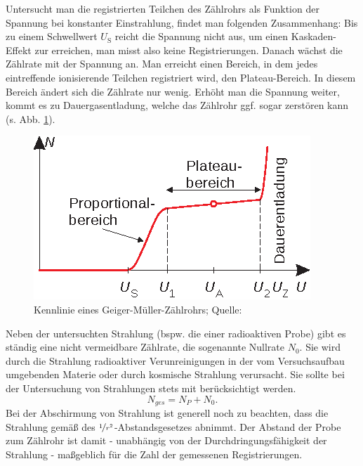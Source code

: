 Untersucht man die registrierten Teilchen des Zählrohrs als Funktion der Spannung bei konstanter Einstrahlung, findet man folgenden Zusammenhang: Bis zu einem Schwellwert $U_\mathrm S$ reicht die Spannung nicht aus, um einen Kaskaden-Effekt zur erreichen, man misst also keine Registrierungen. Danach wächst die Zählrate mit der Spannung an. Man erreicht einen Bereich, in dem jedes eintreffende ionisierende Teilchen registriert wird, den Plateau-Bereich. In diesem Bereich ändert sich die Zählrate nur wenig. Erhöht man die Spannung weiter, kommt es zu Dauergasentladung, welche das Zählrohr ggf. sogar zerstören kann (s. Abb. \ref{fig:i_04_kennlinie}).

\begin{figure}[ht]
\centering
\includegraphics[]{fig/i_04_kennlinie.eps}
\caption{Kennlinie eines Geiger-Müller-Zählrohrs; Quelle: \cite[S. 515]{EKS07}}
\label{fig:i_04_kennlinie}
\end{figure}

Neben der untersuchten Strahlung (bspw. die einer radioaktiven Probe) gibt es ständig eine nicht vermeidbare Zählrate, die sogenannte Nullrate $N_0$. Sie wird durch die Strahlung radioaktiver Verunreinigungen in der vom Versuchsaufbau umgebenden Materie oder durch kosmische Strahlung verursacht. Sie sollte bei der Untersuchung von Strahlungen stets mit berücksichtigt werden.
\begin{equation}
N_{ges} = N_P + N_0.
\end{equation}
Bei der Abschirmung von Strahlung ist generell noch zu beachten, dass die Strahlung gemäß des $\nicefrac{1}{r^2}$-Abstandsgesetzes abnimmt. Der Abstand der Probe zum Zählrohr ist damit - unabhängig von der Durchdringungsfähigkeit der Strahlung - maßgeblich für die Zahl der gemessenen Registrierungen. \cite{EKS07}